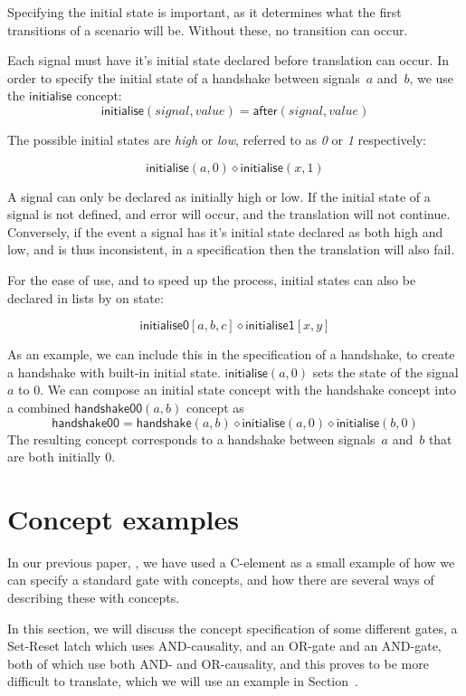 \documentclass[british, journal]{IEEEtran}
\begin{document}
Specifying the initial state is important, as it determines what the first transitions
of a scenario will be. Without these, no transition can occur.

Each signal must have it's initial state declared before translation can occur. 
In order to specify the initial state of a handshake between signals~$a$
and~$b$, we use the $\mathsf{initialise}$ concept:
\[
\mathsf{initialise}(\mathit{signal},\mathit{value})=\mathsf{after}(signal,
value)
\]

\noindent The possible initial states are \emph{high} or \emph{low}, referred to as \emph{0} 
or \emph{1} respectively:

\[
\mathsf{initialise}(a,0) \diamond \mathsf{initialise}(x, 1)
\]

\noindent A signal can only be declared as initially high or low. If the initial state of a signal is 
not defined, and error will occur, and the translation will not continue. Conversely, 
if the event a signal has it's initial state declared as both high and low,
and is thus inconsistent, in a specification then the translation will also fail.

For the ease of use, and to speed up the process, initial states can also be declared
in lists by on state:

\[
\mathsf{initialise0} [a, b, c] \diamond \mathsf{initialise1} [x, y]
\]

\noindent As an example, we can include this in the specification of a handshake, to 
create a handshake with built-in initial state.
$\mathsf{initialise}(a, 0)$ sets the state of the signal
$a$ to $0$. We can compose an initial state concept with the handshake concept
into a combined $\mathsf{handshake00}(a, b)$ concept as
\[
\mathsf{handshake00} = \mathsf{handshake}(a, b) \diamond \mathsf{initialise}(a, 0) \diamond
\mathsf{initialise}(b, 0)
\]
The resulting concept corresponds to a handshake between signals~$a$
and~$b$ that are both initially $0$.

\section{Concept examples \label{sec:examples}}

In our previous paper, \cite{2015_Beaumont_MEMOCODE}, we have 
used a C-element as a small example of how we can specify a standard gate with concepts,
and how there are several ways of describing these with concepts. 

In this section, we will discuss the concept specification of some different gates,
a Set-Reset latch which uses AND-causality, and an OR-gate and an AND-gate, both of 
which use both AND- and OR-causality, and this proves to be more difficult to translate,
which we will use an example in Section~\label{translation-algorithm}.
\end{document}
